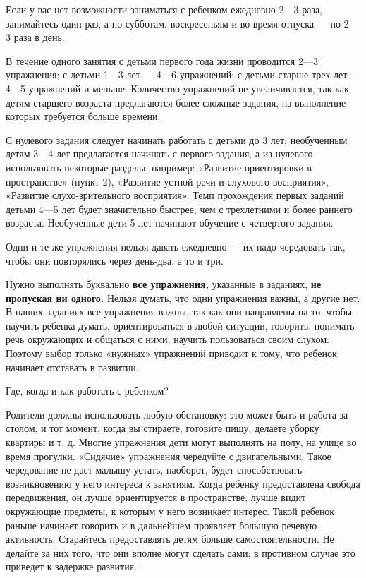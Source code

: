 \documentclass[a5paper]{book}
\begin{document}
Если у вас нет возможности заниматься с ребенком ежедневно 2---3 раза,
занимайтесь один раз, а по субботам, воскресеньям и во время отпуска ---
по 2---3 раза в день.

В течение одного занятия с детьми первого года жизни проводится 2---3
упражнения; с детьми 1---3 лет --- 4---6 упражнений; с детьми старше
трех лет---4---5 упражнений и меньше. Количество упражнений не
увеличивается, так как детям старшего возраста предлагаются более
сложные задания, на выполнение которых требуется больше времени.

С нулевого задания следует начинать работать с детьми до 3 лет;
необученным детям 3---4 лет предлагается начинать с первого задания, а
из нулевого использовать некоторые разделы, например: «Развитие
ориентировки в пространстве» (пункт 2), «Развитие устной речи и
слухового восприятия», «Развитие слухо-зрительного восприятия». Темп
прохождения первых заданий детьми 4---5 лет будет значительно быстрее,
чем с трехлетними и более раннего возраста. Необученные дети 5 лет
начинают обучение с четвертого задания.

Одни и те же упражнения нельзя давать ежедневно --- их надо чередовать
так, чтобы они повторялись через день-два, а то и три.

Нужно выполнять буквально \textbf{все упражнения,} указанные в заданиях,
\textbf{не пропуская ни одного.} Нельзя думать, что одни упражнения
важны, а другие нет. В наших заданиях все упражнения важны, так как они
направлены на то, чтобы научить ребенка думать, ориентироваться в любой
ситуации, говорить, понимать речь окружающих и общаться с ними, научить
пользоваться своим слухом. Поэтому выбор только «нужных» упражнений
приводит к тому, что ребенок начинает отставать в развитии.

Где, когда и как работать с ребенком?

Родители должны использовать любую обстановку: это может быть и работа
за столом, и тот момент, когда вы стираете, готовите пищу, делаете
уборку квартиры и т. д. Многие упражнения дети могут выполнять на полу,
на улице во время прогулки. «Сидячие» упражнения чередуйте с
двигательными. Такое чередование не даст малышу устать, наоборот, будет
способствовать возникновению у него интереса к занятиям. Когда ребенку
предоставлена свобода передвижения, он лучше ориентируется в
пространстве, лучше видит окружающие предметы, к которым у него
возникает интерес. Такой ребенок раньше начинает говорить и в дальнейшем
проявляет большую речевую активность. Старайтесь предоставлять детям
больше самостоятельности. Не делайте за них того, что они вполне могут
сделать сами; в противном случае это приведет к задержке развития.
\end{document}
